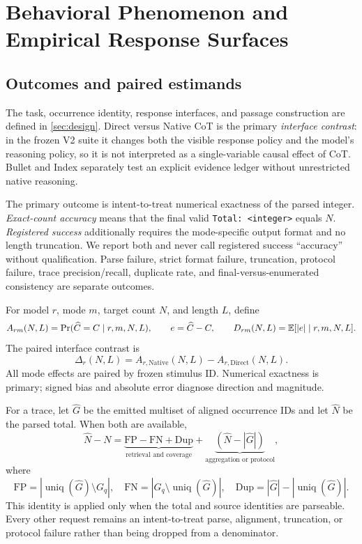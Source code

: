 \section{Behavioral Phenomenon and Empirical Response Surfaces}
\label{sec:behavior}

\subsection{Outcomes and paired estimands}

The task, occurrence identity, response interfaces, and passage construction
are defined in \cref{sec:design}. Direct versus Native CoT is the primary
\emph{interface contrast}: in the frozen V2 suite it changes both the visible
response policy and the model's reasoning policy, so it is not interpreted as
a single-variable causal effect of CoT. Bullet and Index separately test an
explicit evidence ledger without unrestricted native reasoning.

The primary outcome is intent-to-treat numerical exactness of the parsed
integer. \emph{Exact-count accuracy} means that the final valid
\texttt{Total: <integer>} equals \(N\). \emph{Registered success} additionally
requires the mode-specific output format and no length truncation. We report
both and never call registered success ``accuracy'' without qualification.
Parse failure, strict format failure, truncation, protocol failure, trace
precision/recall, duplicate rate, and final-versus-enumerated consistency are
separate outcomes.

For model \(r\), mode \(m\), target count \(N\), and length \(L\), define
\begin{equation}
A_{rm}(N,L)=
\Pr(\widehat C=C\mid r,m,N,L),
\qquad
e=\widehat C-C,
\qquad
D_{rm}(N,L)=\mathbb{E}[|e|\mid r,m,N,L].
\label{eq:behavior-estimands}
\end{equation}
The paired interface contrast is
\begin{equation}
\Delta_r(N,L)=
A_{r,\mathrm{Native}}(N,L)-A_{r,\mathrm{Direct}}(N,L).
\label{eq:cot-gap}
\end{equation}
All mode effects are paired by frozen stimulus ID. Numerical exactness is
primary; signed bias and absolute error diagnose direction and magnitude.

For a trace, let \(\widehat G\) be the emitted multiset of aligned occurrence
IDs and let \(\widehat N\) be the parsed total. When both are available,
\begin{equation}
  \widehat N-N
  =
  \underbrace{\mathrm{FP}-\mathrm{FN}+\mathrm{Dup}}_
  {\text{retrieval and coverage}}
  +
  \underbrace{\left(\widehat N-|\widehat G|\right)}_
  {\text{aggregation or protocol}},
\label{eq:error-budget}
\end{equation}
where
\[
\mathrm{FP}=|\operatorname{uniq}(\widehat G)\setminus G_q|,
\quad
\mathrm{FN}=|G_q\setminus\operatorname{uniq}(\widehat G)|,
\quad
\mathrm{Dup}=|\widehat G|-|\operatorname{uniq}(\widehat G)|.
\]
This identity is applied only when the total and source identities are
parseable. Every other request remains an intent-to-treat parse, alignment,
truncation, or protocol failure rather than being dropped from a denominator.

